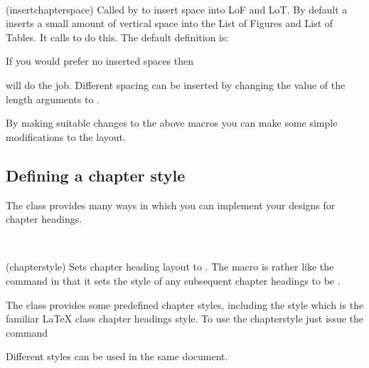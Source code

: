 \begin{syntax}
\cmd{\insertchapterspace} \\
\end{syntax}
\glossary(insertchapterspace)%
  {}%
  {Called by  to insert space into LoF and LoT.}
By default a \cmd{\chapter} inserts a small amount of vertical space
into the List of Figures and List of Tables. It calls \cmd{\insertchapterspace}
to do this. The default definition is:
\begin{lcode}
\newcommand{\insertchapterspace}{%
  \addtocontents{lof}{\protect\addvspace{10pt}}%
  \addtocontents{lot}{\protect\addvspace{10pt}}%
}
\end{lcode}
If you would prefer no inserted spaces then
\begin{lcode}
\renewcommand{\insertchapterspace}{}
\end{lcode}
will do the job.
Different spacing can be inserted by
changing the value of the length arguments to \cmd{\addvspace}.

By making suitable changes to the above macros you can make some
simple modifications to the layout.


\subsection{Defining a chapter style} \label{sec:chapterstyle}


    The class provides many ways in which you can implement your designs
for chapter headings.

\begin{syntax}
\cmd{\chapterstyle} \\
\end{syntax}
\glossary(chapterstyle)%
  {}%
  {Sets chapter heading layout to .}
The macro \cmd{\chapterstyle} is rather like the \cmd{\pagestyle} command in
that it sets the style of any subsequent chapter headings to be .

    The class provides some predefined chapter styles, including the
 style which is the familiar LaTeX  class chapter
headings style. To use the chapterstyle  just issue the command
\begin{lcode}
\end{lcode}
Different styles can be used in the same document.

